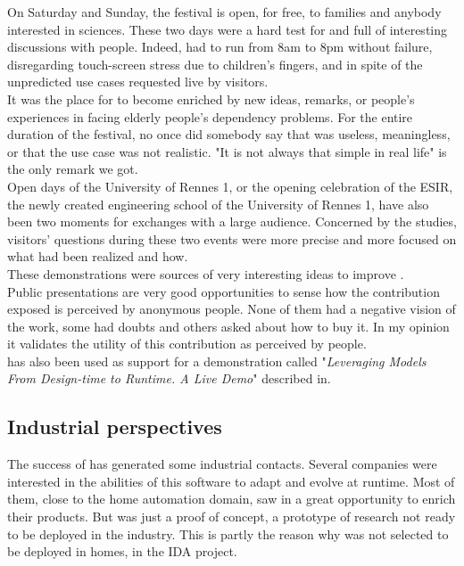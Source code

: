 On Saturday and Sunday, the festival is open, for free, to families and anybody interested in sciences. These two days were a hard test for \enti{} and full of interesting discussions with people. Indeed, \enti{} had to run from 8am to 8pm without failure, disregarding touch-screen stress due to children's fingers, and in spite of the unpredicted use cases requested live by visitors.\\
It was the place for \enti{} to become enriched by new ideas, remarks, or people's experiences in facing elderly people's dependency problems. For the entire duration of the festival, no once did somebody say that \enti{} was useless, meaningless, or that the use case was not realistic. "It is not always that simple in real life" is the only remark we got.\\

Open days of the University of Rennes 1, or the opening celebration of the ESIR, the newly created engineering school of the University of Rennes 1, have also been two moments for exchanges with a large audience. Concerned by the studies, visitors' questions during these two events were more precise and more focused on what had been realized and how.\\
These demonstrations were sources of very interesting ideas to improve \enti{}.\\

Public presentations are very good opportunities to sense how the contribution exposed is perceived by anonymous people. None of them had a negative vision of the work, some had doubts and others asked about how to buy it. In my opinion it validates the utility of this contribution as perceived by people.\\

\enti{} has also been used as support for a demonstration called "{\it Leveraging Models From Design-time to Runtime. A Live Demo}" described in\cite{Morin09e}.

\subsection{Industrial perspectives}

The success of \enti{} has generated some industrial contacts. Several companies were interested in the abilities of this software to adapt and evolve at runtime. Most of them, close to the home automation domain, saw in \enti{} a great opportunity to enrich their products. But \enti{} was just a proof of concept, a prototype of research not ready to be deployed in the industry. This is partly the reason why \enti{} was not selected to be deployed in homes, in the IDA project.\\

